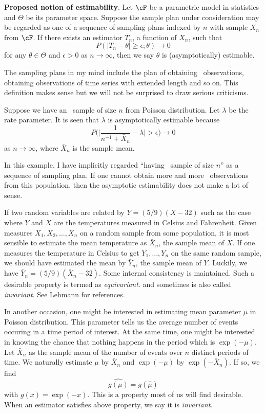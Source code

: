 \begin{defi}
{\bf Proposed notion of estimability}. 
Let $\cF$ be a parametric model in statistics and
$\Theta$ be its parameter space. 
Suppose the sample plan under consideration
may be regarded as one of a sequence of sampling
plans indexed by $n$ with sample $X_n$ from $\cF$.
If there exists an estimator $T_n$, a function of $X_n$, such
that 
\[
P( |T_n - \theta| \geq \epsilon; \theta) \to 0
\]
for any $\theta \in \Theta$ and $\epsilon > 0$ as $n \to \infty$,
then we say $\theta$ is (asymptotically) estimable.
\end{defi}

The sampling plans in my mind include the plan of obtaining
\iid\ observations,  obtaining observations of time series
with extended length and so on. This definition makes sense
but we will not be surprised to draw serious criticisms.

\begin{example}
Suppose we have an \iid\ sample of size $n$ from Poisson
distribution. Let $\lambda$ be the rate parameter.
It is seen that $\lambda$ is asymptotically estimable
because
\[
P\big ( \big | \frac{1}{n^{-1} + \bar X_n} - \lambda \big | > \epsilon \big ) \to 0
\]
as $n \to \infty$, where $\bar X_n$ is the sample mean.
\end{example}

In this example, I have implicitly regarded ``having \iid\ sample of
size $n$'' as a sequence of sampling plan. If one cannot obtain
more and more \iid\ observations from this population, then the
asymptotic estimability does not make a lot of sense.

If two random variables are related by $Y = (5/9)(X - 32)$ such as
the case where $Y$ and $X$ are the temperatures
measured in Celsius and  Fahrenheit. Given measures
$X_1, X_2, \ldots, X_n$ on a random sample
from some population, it is most sensible to estimate the
mean temperature as $\bar X_n$, the sample mean of
$X$. If one measures the
temperature in Celsius to get $Y_1, \ldots, Y_n$ on the
same random sample, we should have estimated
the mean by $\bar Y_n$, the sample mean of $Y$.
Luckily, we have $\bar Y_n = (5/9)(\bar X_n - 32)$.
Some internal consistency is maintained.
Such a desirable property is termed as {\it equivariant}.
and sometimes is also called {\it invariant}.
See Lehmann for references.

In another occasion, one might be interested in estimating
mean parameter $\mu$ in Poisson distribution. This parameter
tells us the average number of events occuring in a time period
of interest. At the same time, one might be interested
in knowing the chance that nothing happens in the period
which is $\exp(- \mu)$.
Let $\bar X_n$ as the sample mean of the number
of events over $n$ distinct periods of time. 
We naturally estimate $\mu$ by $\bar X_n$ and
$\exp( - \mu)$ by $\exp( - \bar X_n)$. If so, we find
\[
\widehat {g(\mu)} = g(\hat \mu)
\]
with $g(x) = \exp(-x)$.
This is a property most of us will find desirable. 
When an estimator satisfies above property, we say
it is {\it invariant}. 

